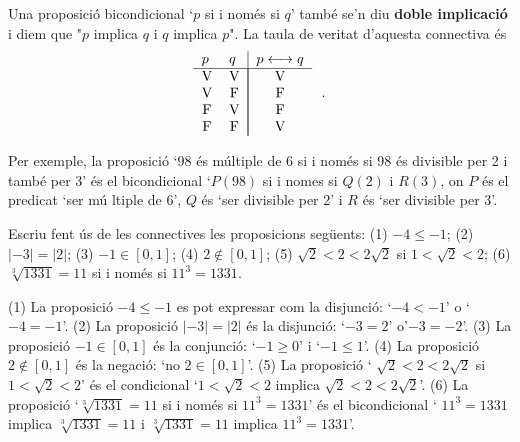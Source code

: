 Una proposici\'{o} bicondicional `$p$ si i nom\'{e}s si $q$' tamb\'{e} se'n
diu \textbf{doble implicaci\'{o}} i diem que "$p$ implica $q$ i $q$ implica $%
p$". La taula de veritat d'aquesta connectiva \'{e}s%
\begin{equation*}
\begin{tabular}{ll|l}
$p$ & $q$ & $p\longleftrightarrow q$ \\ \hline
\multicolumn{1}{c}{V} & \multicolumn{1}{c|}{V} & \multicolumn{1}{|c}{V} \\
\multicolumn{1}{c}{V} & \multicolumn{1}{c|}{F} & \multicolumn{1}{|c}{F} \\
\multicolumn{1}{c}{F} & \multicolumn{1}{c|}{V} & \multicolumn{1}{|c}{F} \\
\multicolumn{1}{c}{F} & \multicolumn{1}{c|}{F} & \multicolumn{1}{|c}{V}%
\end{tabular}
\text{.}
\end{equation*}

Per exemple, la proposici\'{o} `98 \'{e}s m\'{u}ltiple de 6 si i nom\'{e}s
si 98 \'{e}s divisible per 2 i tamb\'{e} per 3' \'{e}s el bicondicional `$%
P(98)$ si i nomes si $Q(2)$ i $R(3)$, on $P$ \'{e}s el predicat `ser m\'{u}%
ltiple de 6', $Q$ \'{e}s `ser divisible per 2' i $R$ \'{e}s `ser divisible
per 3'.

\begin{exem}
Escriu fent \'{u}s de les connectives les proposicions seg\"{u}ents: (1) $%
-4\leq-1$; (2) $\left\vert -3\right\vert =\left\vert 2\right\vert $; (3) $%
-1\in\left[ 0,1\right] $; (4) $2\notin\left[ 0,1\right] $; (5) $\sqrt {2}<2<2%
\sqrt{2}$ si $1<\sqrt{2}<2$; (6) $\sqrt[3]{1331}=11$ si i nom\'{e}s si $%
11^{3}=1331$.
\end{exem}

\begin{solucio}
(1) La proposici\'{o} $-4\leq-1$ es pot expressar com la disjunci\'{o}: `$%
-4<-1$' o `$-4=-1$'. (2) La proposici\'{o} $\left\vert -3\right\vert
=\left\vert 2\right\vert $ \'{e}s la disjunci\'{o}: `$-3=2$' o'$-3=-2$'. (3)
La proposici\'{o} $-1\in\left[ 0,1\right] $ \'{e}s la conjunci\'{o}: `$%
-1\geq0$' i `$-1\leq1$'. (4) La proposici\'{o} $2\notin\left[ 0,1\right] $
\'{e}s la negaci\'{o}: `no $2\in\left[ 0,1\right] $'. (5) La proposici\'{o} `%
$\sqrt{2}<2<2\sqrt{2}$ si $1<\sqrt{2}<2$' \'{e}s el condicional `$1<\sqrt {2}%
<2$ implica $\sqrt{2}<2<2\sqrt{2}$'. (6) La proposici\'{o} `$\sqrt[3]{1331}%
=11$ si i nom\'{e}s si $11^{3}=1331$' \'{e}s el bicondicional ` $11^{3}=1331$
implica $\sqrt[3]{1331}=11$ i $\sqrt[3]{1331}=11$ implica $11^{3}=1331$'.
\end{solucio}

